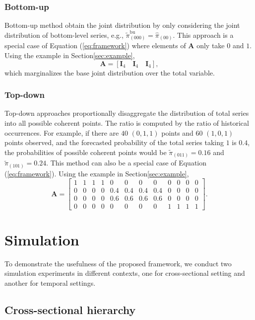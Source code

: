 \documentclass[a4paper,review,12pt,authoryear]{elsarticle}
\begin{document}
   \subsubsection*{Bottom-up}
   \label{sec:bottomup}
   Bottom-up method obtain the joint distribution by only considering the joint distribution of bottom-level series, e.g., $\tilde\pi^{\text{bu}}_{(000)} = \hat\pi_{(00)}$. 
   This approach is a special case of Equation (\ref{eq:framework}) where elements of $\mathbf{A}$ only take $0$ and $1$. 
   Using the example in Section\ref{sec:example},
   \[
    \mathbf{A} = [\mathbf{I}_4\quad \mathbf{I}_4 \quad \mathbf{I}_4 ],
  \]
   which marginalizes the base joint distribution over the total variable.

   \subsubsection*{Top-down}

   Top-down approaches proportionally disaggregate the distribution of total series into all possible coherent points. 
   The ratio is computed by the ratio of historical occurrences.
   For example, if there are $40$ $(0, 1, 1)$ points and $60$ $(1, 0, 1) $ points observed, and the forecasted probability of the total series taking $1$ is $0.4$, the probabilities of possible coherent points would be $\tilde \pi_{(011)} = 0.16$ and $\tilde \pi_{(101)} = 0.24$.
   This method can also be a special case of Equation (\ref{eq:framework}).
   Using the example in Section\ref{sec:example},
   \[
    \mathbf{A} = \left[\begin{matrix}
      1 & 1 & 1 & 1 & 0 & 0 & 0 & 0 & 0 & 0 & 0 & 0 \\
      0 & 0 & 0 & 0 & 0.4 & 0.4 & 0.4 & 0.4 & 0 & 0 & 0 & 0 \\      
      0 & 0 & 0 & 0 & 0.6 & 0.6 & 0.6 & 0.6 & 0 & 0 & 0 & 0 \\
      0 & 0 & 0 & 0 & 0 & 0 & 0 & 0 & 1 & 1 & 1 & 1  
    \end{matrix}\right].
   \]

\section{Simulation}
\label{sec:simulation}
To demonstrate the usefulness of the proposed framework, we conduct two simulation experiments in different contexts, one for cross-sectional setting and another for temporal settings. 

\subsection{Cross-sectional hierarchy}
\label{sec:cross-sectional_simu}
\end{document}
